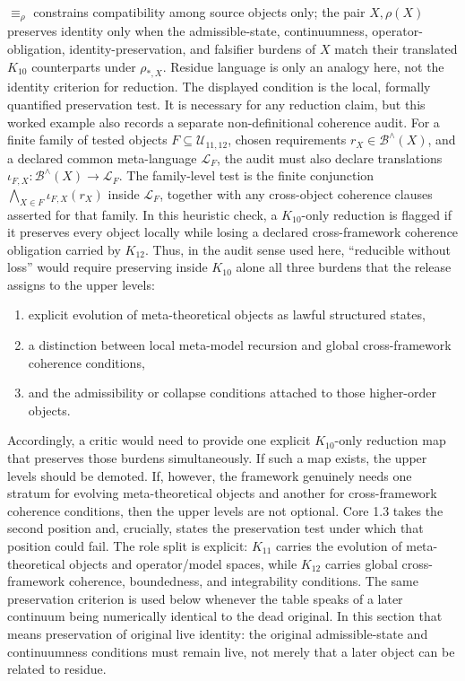 \(\equiv_{\rho}\) constrains compatibility among source objects only; the
pair \(X,\rho(X)\) preserves identity only when the admissible-state,
continuumness, operator-obligation, identity-preservation, and falsifier
burdens of \(X\) match their translated \(K_{10}\) counterparts under
\(\rho_{\ast,X}\). Residue language
is only an analogy here, not the identity criterion for reduction.
The displayed condition is the local, formally quantified preservation test.
It is necessary for any reduction claim, but this worked example also records
a separate non-definitional coherence audit. For a finite family of tested
objects \(F\subseteq\mathcal{U}_{11,12}\), chosen requirements
\(r_X\in\mathcal{B}^{\wedge}(X)\), and a declared common meta-language
\(\mathcal{L}_F\), the audit must also declare translations
\(\iota_{F,X}:\mathcal{B}^{\wedge}(X)\to\mathcal{L}_F\). The family-level
test is the finite conjunction
\(\bigwedge_{X\in F}\iota_{F,X}(r_X)\) inside \(\mathcal{L}_F\), together
with any cross-object coherence clauses asserted for that family. In this
heuristic check, a
\(K_{10}\)-only reduction is flagged if it preserves every object locally
while losing a declared cross-framework coherence obligation carried by
\(K_{12}\). Thus, in the audit sense used here, ``reducible without loss''
would require preserving inside \(K_{10}\) alone all three burdens that the
release assigns to the upper levels:
\begin{enumerate}
\item explicit evolution of meta-theoretical objects as lawful structured
      states,
\item a distinction between local meta-model recursion and global
      cross-framework coherence conditions,
\item and the admissibility or collapse conditions attached to those
      higher-order objects.
\end{enumerate}
Accordingly, a critic would need to provide one explicit \(K_{10}\)-only
reduction map that preserves those burdens simultaneously. If such a map
exists, the upper levels should be demoted. If, however, the framework
genuinely needs one stratum for evolving meta-theoretical objects and another
for cross-framework coherence conditions, then the upper levels are not
optional. Core 1.3 takes the second position and, crucially, states the
preservation test under which that position could fail.
The role split is explicit: \(K_{11}\) carries the evolution of
meta-theoretical objects and operator/model spaces, while \(K_{12}\) carries
global cross-framework coherence, boundedness, and integrability conditions.
The same preservation criterion is used below whenever the table speaks of a
later continuum being numerically identical to the dead original. In this
section that means preservation of original live identity: the original
admissible-state and continuumness conditions must remain live, not merely
that a later object can be related to residue.

